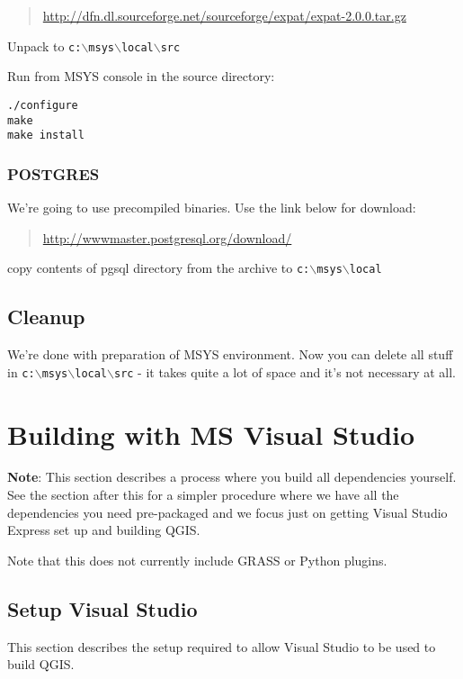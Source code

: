 	\begin{quotation}
\url{http://dfn.dl.sourceforge.net/sourceforge/expat/expat-2.0.0.tar.gz}
	\end{quotation}

Unpack to \texttt{c:$\backslash$msys$\backslash$local$\backslash$src}

Run from MSYS console in the source directory:

\begin{verbatim}
./configure
make
make install
\end{verbatim}

\subsubsection{POSTGRES}
We're going to use precompiled binaries. Use the link below for download:

\begin{quotation}
\url{http://wwwmaster.postgresql.org/download/}
\end{quotation}

copy contents of pgsql directory from the archive to \texttt{c:$\backslash$msys$\backslash$local}

\subsection{Cleanup}
We're done with preparation of MSYS environment. Now you can delete all stuff in \texttt{c:$\backslash$msys$\backslash$local$\backslash$src} - it takes quite a lot
of space and it's not necessary at all.


\section{Building with MS Visual Studio}
\textbf{Note}:   This section describes a process where you build all dependencies yourself. See the section
after this for a simpler procedure where we have all the dependencies you need pre-packaged
and we focus just on getting Visual Studio Express set up and building QGIS.

Note that this does not currently include GRASS or Python plugins.

\subsection{Setup Visual Studio}
This section describes the setup required to allow Visual Studio to be used to build QGIS. 


